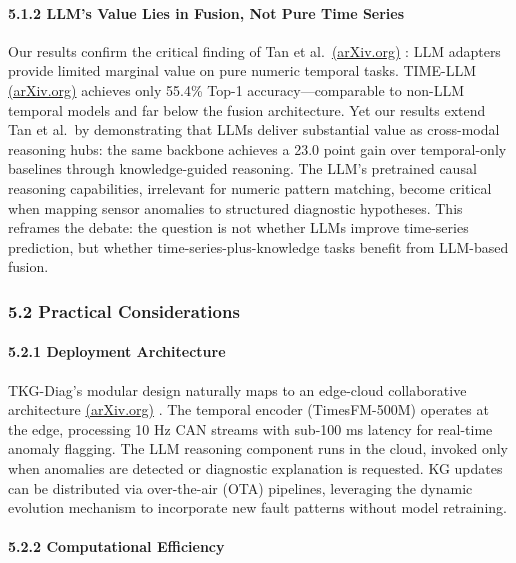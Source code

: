 \documentclass[
  11pt,
]{article}
\begin{document}
\paragraph{5.1.2 LLM's Value Lies in Fusion, Not Pure Time
Series}\label{llms-value-lies-in-fusion-not-pure-time-series}

Our results confirm the critical finding of Tan et
al.~\href{https://arxiv.org/html/2406.16964v2}{(arXiv.org)} : LLM
adapters provide limited marginal value on pure numeric temporal tasks.
TIME-LLM \href{https://arxiv.org/pdf/2310.01728}{(arXiv.org)} achieves
only 55.4\% Top-1 accuracy---comparable to non-LLM temporal models and
far below the fusion architecture. Yet our results extend Tan et al.~by
demonstrating that LLMs deliver substantial value as cross-modal
reasoning hubs: the same backbone achieves a 23.0 point gain over
temporal-only baselines through knowledge-guided reasoning. The LLM's
pretrained causal reasoning capabilities, irrelevant for numeric pattern
matching, become critical when mapping sensor anomalies to structured
diagnostic hypotheses. This reframes the debate: the question is not
whether LLMs improve time-series prediction, but whether
time-series-plus-knowledge tasks benefit from LLM-based fusion.

\subsubsection{5.2 Practical
Considerations}\label{practical-considerations}

\paragraph{5.2.1 Deployment Architecture}\label{deployment-architecture}

TKG-Diag's modular design naturally maps to an edge-cloud collaborative
architecture \href{https://arxiv.org/html/2408.09972v1}{(arXiv.org)} .
The temporal encoder (TimesFM-500M) operates at the edge, processing 10
Hz CAN streams with sub-100 ms latency for real-time anomaly flagging.
The LLM reasoning component runs in the cloud, invoked only when
anomalies are detected or diagnostic explanation is requested. KG
updates can be distributed via over-the-air (OTA) pipelines, leveraging
the dynamic evolution mechanism to incorporate new fault patterns
without model retraining.

\paragraph{5.2.2 Computational
Efficiency}\label{computational-efficiency}
\end{document}
